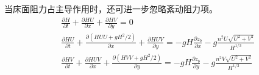                                                         当床面阻力占主导作用时，还可进一步忽略紊动阻力项。
                                                        \begin{equation}
                                                          \begin{gathered}
                                                            \frac{\partial H}{\partial t} +
                                                            \frac{\partial HU}{\partial x} +
                                                            \frac{\partial HV}{\partial y}
                                                            =
                                                            0
                                                            \\
                                                            \frac{\partial HU}{\partial t} +
                                                            \frac{\partial (HUU+gH^{2}/2)}{\partial x} +
                                                            \frac{\partial HUV}{\partial y}
                                                            =
                                                            -gH\frac{\partial z_{b}}{\partial x}
                                                            -g\frac{n^{2}U\sqrt{U^{2}+V^{2}}}{H^{1/3}}
                                                            \\
                                                            \frac{\partial HV}{\partial t} +
                                                            \frac{\partial HUV}{\partial x} +
                                                            \frac{\partial (HVV+gH^{2}/2)}{\partial y}
                                                            =
                                                            -gH\frac{\partial z_{b}}{\partial y}
                                                            -g\frac{n^{2}V\sqrt{U^{2}+V^{2}}}{H^{1/3}}
                                                          \end{gathered}
                                                        \end{equation}

